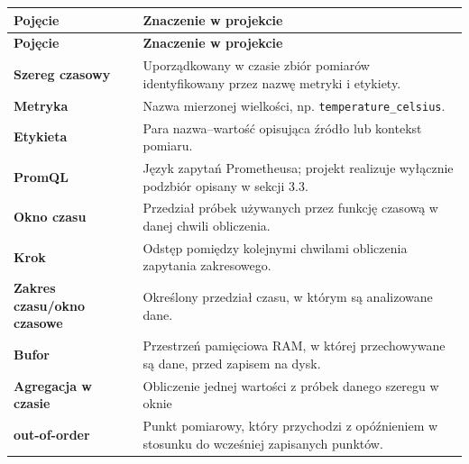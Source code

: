 \documentclass[12pt,a4paper]{article}
\begin{document}
\begingroup
\small
\begin{longtable}{>{\raggedright\arraybackslash}p{}>{\raggedright\arraybackslash}p{}}
    \hline
    \textbf{Pojęcie}                   & \textbf{Znaczenie w projekcie}                                                              \\
    \hline
    \endfirsthead
    \textbf{Pojęcie}                   & \textbf{Znaczenie w projekcie}                                                              \\
    \hline
    \endhead
    \textbf{Szereg czasowy}            & Uporządkowany w czasie zbiór pomiarów identyfikowany przez nazwę metryki i etykiety.        \\
    \hline
    \textbf{Metryka}                   & Nazwa mierzonej wielkości, np. \texttt{temperature\_\allowbreak{}celsius}.                  \\
    \hline
    \textbf{Etykieta}                  & Para nazwa–wartość opisująca źródło lub kontekst pomiaru.                                   \\
    \hline
    \textbf{PromQL}                    & Język zapytań Prometheusa; projekt realizuje wyłącznie podzbiór opisany w sekcji 3.3.       \\
    \hline
    \textbf{Okno czasu}                & Przedział próbek używanych przez funkcję czasową w danej chwili obliczenia.                 \\
    \hline
    \textbf{Krok}                      & Odstęp pomiędzy kolejnymi chwilami obliczenia zapytania zakresowego.                        \\
    \hline
    \textbf{Zakres czasu/okno czasowe} & Określony przedział czasu, w którym są analizowane dane.                                    \\
    \hline
    \textbf{Bufor}                     & Przestrzeń pamięciowa RAM, w której przechowywane są dane, przed zapisem na dysk.           \\
    \hline
    \textbf{Agregacja w czasie}        & Obliczenie jednej wartości z próbek danego szeregu w oknie                                  \\
    \hline
    \textbf{out-of-order}              & Punkt pomiarowy, który przychodzi z opóźnieniem w stosunku do wcześniej zapisanych punktów. \\
    \hline
\end{longtable}
\endgroup
\end{document}
